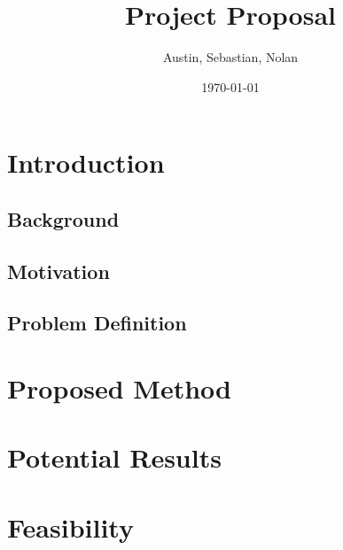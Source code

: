 \documentclass[11pt,a4paper]{article}
\title{Project Proposal}
\author{Austin, Sebastian, Nolan}
\date{\today}
\begin{document}
\maketitle

\section{Introduction}

\subsection{Background}

\subsection{Motivation}

\subsection{Problem Definition}

\section{Proposed Method}

\section{Potential Results}

\section{Feasibility}
\end{document}
